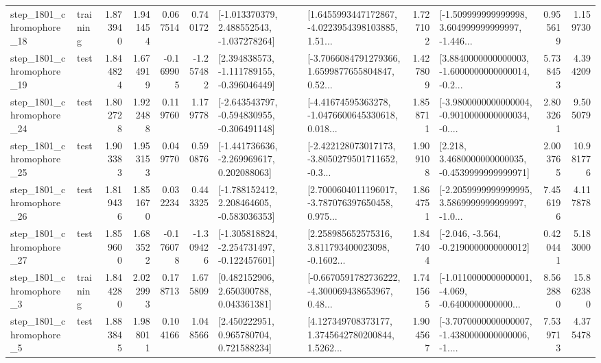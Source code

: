 \begin{tabular}{llrrrrllrlrr}
 step\_1801\_chromophore\_18 &  training &      1.873940 &    1.941454 &      0.067514 &  0.740172 &   [-1.013370379, 2.488552543, -1.037278264] &  [1.6455993447172867, -4.0223954398103885, 1.51... &       1.727102 &  [-1.509999999999998, 3.604999999999997, -1.446... &            0.955619 &          1.159730 \\
 step\_1801\_chromophore\_19 &      test &      1.844824 &    1.674919 &     -0.169905 & -1.257482 &   [2.394838573, -1.111789155, -0.396046449] &  [-3.7066084791279366, 1.6599877655804847, 0.52... &       1.427809 &  [3.8840000000000003, -1.6000000000000014, -0.2... &            5.738453 &          4.394209 \\
 step\_1801\_chromophore\_24 &      test &      1.802728 &    1.922488 &      0.119760 &  1.179778 &  [-2.643543797, -0.594830955, -0.306491148] &  [-4.41674595363278, -1.0476600645330618, 0.018... &       1.858711 &  [-3.9800000000000004, -0.9010000000000034, -0.... &            2.803261 &          9.505079 \\
 step\_1801\_chromophore\_25 &      test &      1.903383 &    1.953153 &      0.049770 &  0.590876 &   [-1.441736636, -2.269969617, 0.202088063] &  [-2.422128073017173, -3.8050279501711652, -0.3... &       1.909108 &   [2.218, 3.4680000000000035, -0.4539999999999971] &            2.003765 &         10.981776 \\
 step\_1801\_chromophore\_26 &      test &      1.819436 &    1.851670 &      0.032234 &  0.443325 &   [-1.788152412, 2.208464605, -0.583036353] &  [2.7000604011196017, -3.787076397650458, 0.975... &       1.864751 &  [-2.2059999999999995, 3.5869999999999997, -1.0... &            7.456196 &          4.117878 \\
 step\_1801\_chromophore\_27 &      test &      1.859600 &    1.683522 &     -0.176078 & -1.309426 &  [-1.305818824, -2.254731497, -0.122457601] &  [2.258985652575316, 3.811793400023098, -0.1602... &       1.847404 &              [-2.046, -3.564, -0.2190000000000012] &            0.420441 &          5.183000 \\
  step\_1801\_chromophore\_3 &  training &      1.844280 &    2.022993 &      0.178713 &  1.675809 &     [0.482152906, 2.650300788, 0.043361381] &  [-0.6670591782736222, -4.300069438653967, 0.48... &       1.741565 &  [-1.0110000000000001, -4.069, -0.6400000000000... &            8.562880 &         15.862380 \\
  step\_1801\_chromophore\_5 &      test &      1.883845 &    1.988011 &      0.104166 &  1.048566 &     [2.450222951, 0.965780704, 0.721588234] &  [4.127349708373177, 1.3745642780200844, 1.5262... &       1.904567 &  [-3.7070000000000007, -1.4380000000000006, -1.... &            7.539713 &          4.375478 \\

\end{tabular}
